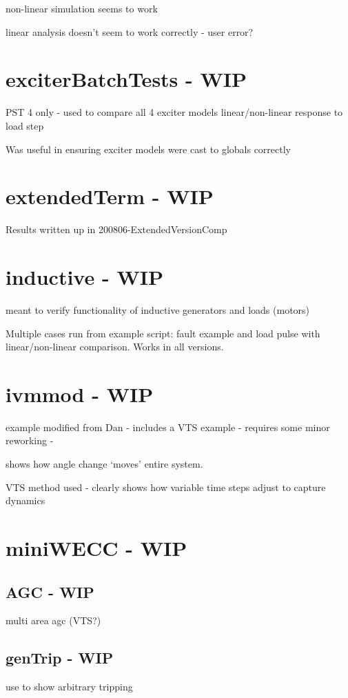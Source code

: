 non-linear simulation seems to work

linear analysis doesn't seem to work correctly - user error?


\section{exciterBatchTests - WIP}
PST 4 only - used to compare all 4 exciter models linear/non-linear response to load step

Was useful in ensuring exciter models were cast to globals correctly

\section{extendedTerm - WIP}
Results written up in 200806-ExtendedVersionComp


\section{inductive - WIP}
meant to verify functionality of inductive generators and loads (motors)

Multiple cases run from example script: fault example and load pulse with linear/non-linear comparison.
Works in all versions.

\section{ivmmod - WIP}
example modified from Dan - includes a VTS example  -
requires some minor reworking - 

shows how angle change `moves' entire system.

VTS method used - clearly shows how variable time steps adjust to capture dynamics

\section{miniWECC - WIP}

	\subsection{AGC - WIP} 
multi area agc (VTS?)

	\subsection{genTrip - WIP} 
use to show arbitrary tripping



